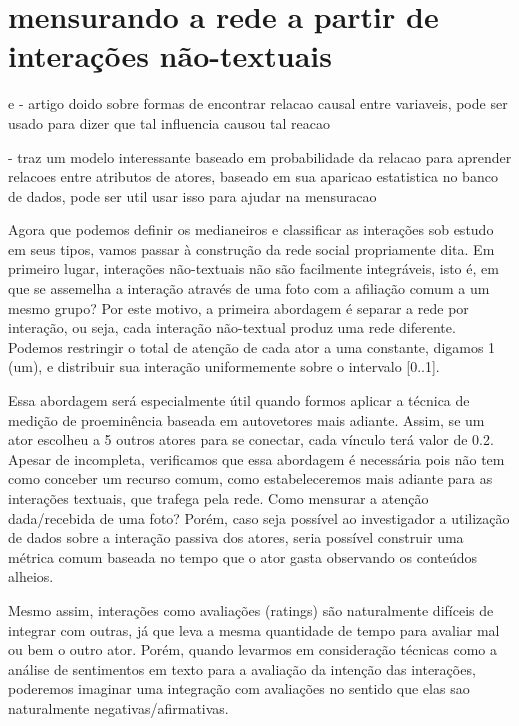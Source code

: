 \documentclass{article}
\begin{document}
\section{mensurando a rede a partir de interações não-textuais}

\cite{Cooper1997} e \cite{Silverstein2000} - artigo doido sobre formas de
encontrar relacao causal entre variaveis, pode ser usado para dizer que tal
influencia causou tal reacao

\cite{Friedman1999} - traz um modelo interessante baseado em probabilidade da
relacao para aprender relacoes entre atributos de atores, baseado em sua
aparicao estatistica no banco de dados, pode ser util usar isso para ajudar na
mensuracao

Agora que podemos definir os medianeiros e classificar as interações sob estudo
em seus tipos, vamos passar à construção da rede social propriamente dita. Em
primeiro lugar, interações não-textuais não são facilmente integráveis, isto é,
em que se assemelha a interação através de uma foto com a afiliação comum a
um mesmo grupo? Por este motivo, a primeira abordagem é separar a rede por
interação, ou seja, cada interação não-textual produz uma rede diferente.
Podemos restringir o total de atenção de cada ator a uma constante, digamos 1
(um), e distribuir sua interação uniformemente sobre o intervalo [0..1].

Essa abordagem será especialmente útil quando formos aplicar a técnica de
medição de proeminência baseada em autovetores mais adiante. Assim, se um
ator escolheu a 5 outros atores para se conectar, cada vínculo terá valor de
0.2. Apesar de incompleta, verificamos que essa abordagem é necessária pois não
tem como conceber um recurso comum, como estabeleceremos mais adiante para as
interações textuais, que trafega pela rede. Como mensurar a atenção
dada/recebida de uma foto? Porém, caso seja possível ao investigador a
utilização de dados sobre a interação passiva dos atores, seria possível
construir uma métrica comum baseada no tempo que o ator gasta observando os
conteúdos alheios.

Mesmo assim, interações como avaliações (ratings) são naturalmente difíceis de
integrar com outras, já que leva a mesma quantidade de tempo para avaliar mal ou
bem o outro ator. Porém, quando levarmos em consideração técnicas como a análise
de sentimentos em texto para a avaliação da intenção das interações, poderemos
imaginar uma integração com avaliações no sentido que elas sao naturalmente
negativas/afirmativas.
\end{document}
